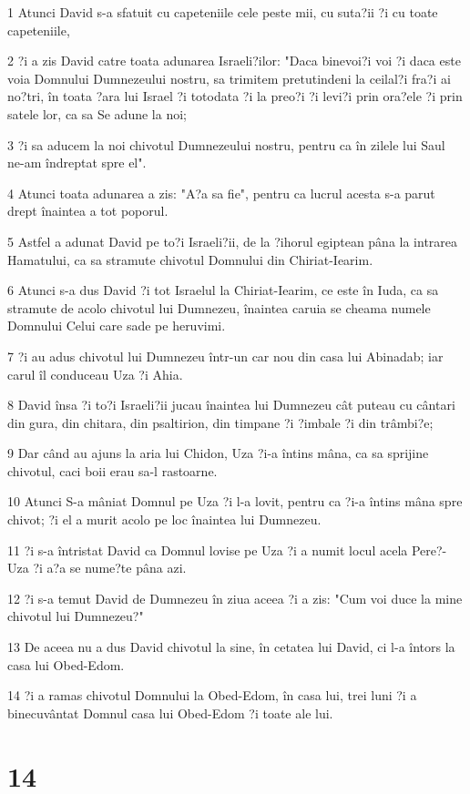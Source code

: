 \par 1 Atunci David s-a sfatuit cu capeteniile cele peste mii, cu suta?ii ?i cu toate capeteniile,
\par 2 ?i a zis David catre toata adunarea Israeli?ilor: "Daca binevoi?i voi ?i daca este voia Domnului Dumnezeului nostru, sa trimitem pretutindeni la ceilal?i fra?i ai no?tri, în toata ?ara lui Israel ?i totodata ?i la preo?i ?i levi?i prin ora?ele ?i prin satele lor, ca sa Se adune la noi;
\par 3 ?i sa aducem la noi chivotul Dumnezeului nostru, pentru ca în zilele lui Saul ne-am îndreptat spre el".
\par 4 Atunci toata adunarea a zis: "A?a sa fie", pentru ca lucrul acesta s-a parut drept înaintea a tot poporul.
\par 5 Astfel a adunat David pe to?i Israeli?ii, de la ?ihorul egiptean pâna la intrarea Hamatului, ca sa stramute chivotul Domnului din Chiriat-Iearim.
\par 6 Atunci s-a dus David ?i tot Israelul la Chiriat-Iearim, ce este în Iuda, ca sa stramute de acolo chivotul lui Dumnezeu, înaintea caruia se cheama numele Domnului Celui care sade pe heruvimi.
\par 7 ?i au adus chivotul lui Dumnezeu într-un car nou din casa lui Abinadab; iar carul îl conduceau Uza ?i Ahia.
\par 8 David însa ?i to?i Israeli?ii jucau înaintea lui Dumnezeu cât puteau cu cântari din gura, din chitara, din psaltirion, din timpane ?i ?imbale ?i din trâmbi?e;
\par 9 Dar când au ajuns la aria lui Chidon, Uza ?i-a întins mâna, ca sa sprijine chivotul, caci boii erau sa-l rastoarne.
\par 10 Atunci S-a mâniat Domnul pe Uza ?i l-a lovit, pentru ca ?i-a întins mâna spre chivot; ?i el a murit acolo pe loc înaintea lui Dumnezeu.
\par 11 ?i s-a întristat David ca Domnul lovise pe Uza ?i a numit locul acela Pere?-Uza ?i a?a se nume?te pâna azi.
\par 12 ?i s-a temut David de Dumnezeu în ziua aceea ?i a zis: "Cum voi duce la mine chivotul lui Dumnezeu?"
\par 13 De aceea nu a dus David chivotul la sine, în cetatea lui David, ci l-a întors la casa lui Obed-Edom.
\par 14 ?i a ramas chivotul Domnului la Obed-Edom, în casa lui, trei luni ?i a binecuvântat Domnul casa lui Obed-Edom ?i toate ale lui.

\chapter{14}


